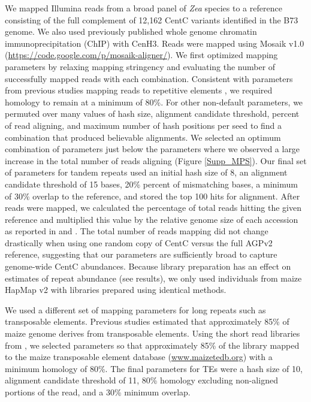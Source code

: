 We mapped Illumina reads from a broad panel of \emph{Zea} species \citep{Chia2012,Tenaillon2011}  to a reference consisting of the full complement of 12,162 CentC variants identified in the B73 genome.  We also used previously published whole genome chromatin immunoprecipitation (ChIP) \citep{Wolfgruber2009, Wang2013} with CenH3.  Reads were mapped using  Mosaik v1.0 (\url{https://code.google.com/p/mosaik-aligner/}). We first optimized mapping parameters by relaxing mapping stringency and evaluating the number of successfully mapped reads with each combination.  Consistent with parameters from previous studies mapping reads to repetitive elements \citep{Tenaillon2011}, we required homology to remain at a minimum of 80\%.  For other non-default parameters, we permuted over many values of hash size, alignment candidate threshold,  percent of read aligning, and maximum number of hash positions per seed to find a combination that produced believable alignments.  We selected an optimum combination of parameters just below the parameters where we observed a large increase in the total number of reads aligning (Figure \ref{Supp_MPS}).    Our final set of parameters for tandem repeats used an initial hash size of 8, an alignment candidate threshold of 15 bases, 20\% percent of mismatching bases, a minimum of 30\% overlap to the reference, and stored the top 100 hits for alignment.  After reads were mapped, we calculated the percentage of total reads hitting the given reference and multiplied this value by the relative genome size of each accession as reported in \citet{Chia2012} and \citet{Tenaillon2011}. The total number of reads mapping did not change drastically when using one random copy of CentC versus the full AGPv2 reference, suggesting that our parameters are sufficiently broad to capture genome-wide CentC abundances.  Because library preparation has an effect on estimates of repeat abundance (see results), we only used individuals from maize HapMap v2 \citep{Chia2012} with libraries prepared using identical methods.
	
We used a different set of mapping parameters for long repeats such as transposable elements.  Previous studies \citep{Schnable2009} estimated that approximately 85\% of maize genome derives from transposable elements.  Using the short read libraries from \citet{Tenaillon2011}, we selected parameters so that approximately 85\% of the library mapped to the maize transposable element database (\url{www.maizetedb.org}) with a minimum homology of 80\%.  The final parameters for TEs were a hash size of 10, alignment candidate threshold of 11, 80\% homology excluding non-aligned portions of the read, and a 30\% minimum overlap.

